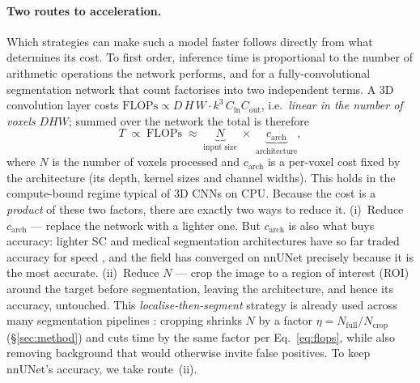 \documentclass[11pt]{article}
\begin{document}
\paragraph{Two routes to acceleration.}
Which strategies can make such a model faster follows directly from what
determines its cost. To first order, inference time is proportional to the number
of arithmetic operations the network performs, and for a fully-convolutional
segmentation network that count factorises into two independent terms. A 3D
convolution layer costs $\mathrm{FLOPs}\propto D\,H\,W\cdot k^3\,C_{\mathrm{in}}
C_{\mathrm{out}}$, i.e.\ \emph{linear in the number of voxels} $D H W$; summed over
the network the total is therefore
\begin{equation}\label{eq:flops}
  T \;\propto\; \mathrm{FLOPs} \;\approx\; \underbrace{N}_{\text{input size}}\;\times\;
  \underbrace{c_{\mathrm{arch}}}_{\text{architecture}},
\end{equation}
where $N$ is the number of voxels processed and $c_{\mathrm{arch}}$ is a per-voxel
cost fixed by the architecture (its depth, kernel sizes and channel widths). This
holds in the compute-bound regime typical of 3D CNNs on CPU. Because the cost is a
\emph{product} of these two factors, there are exactly two ways to reduce it.
(i)~Reduce $c_{\mathrm{arch}}$ --- replace the network with a lighter one. But
$c_{\mathrm{arch}}$ is also what buys accuracy: lighter SC and medical
segmentation architectures have so far traded accuracy for speed \cite{}, and the
field has converged on nnUNet \cite{isensee2021nnunet} precisely because it is the
most accurate. (ii)~Reduce $N$ --- crop the image to a region of interest (ROI)
around the target before segmentation, leaving the architecture, and hence its
accuracy, untouched. This \emph{localise-then-segment} strategy is already used
across many segmentation pipelines \cite{lemay2021tumor, gros2021tumor,
isensee2021nnunet, bencevic2023sts}: cropping shrinks $N$ by a factor
$\eta = N_{\mathrm{full}}/N_{\mathrm{crop}}$ (\S\ref{sec:method}) and cuts time by
the same factor per Eq.~\eqref{eq:flops}, while also removing background that would
otherwise invite false positives. To keep nnUNet's accuracy, we take route~(ii).
\end{document}

